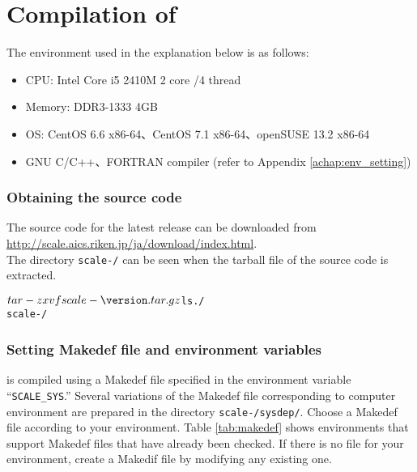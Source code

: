 \section{Compilation of \scalelib} \label{sec:scale_compile}

The environment used in the explanation below is as follows:
\begin{itemize}
\item CPU: Intel Core i5 2410M 2 core /4 thread
\item Memory: DDR3-1333 4GB
\item OS: CentOS 6.6 x86-64、CentOS 7.1 x86-64、openSUSE 13.2 x86-64
\item GNU C/C++、FORTRAN compiler (refer to Appendix \ref{achap:env_setting})
\end{itemize}

\subsubsection{Obtaining the source code} %
The source code for the latest release can be downloaded
from \url{http://scale.aics.riken.jp/ja/download/index.html}.\\
The directory \texttt{scale-{\version}/} can be seen when the tarball file of the source code is extracted. 
\begin{alltt}
 $ tar -zxvf scale-{\version}.tar.gz
 $ ls ./
    scale-{\version}/
\end{alltt}

\subsubsection{Setting Makedef file and environment variables} %

\scalelib is compiled using a Makedef file specified in the environment variable ``\verb|SCALE_SYS|.''  Several variations of the Makedef file corresponding to computer environment are prepared in the directory \texttt{scale-{\version}/sysdep/}.  Choose a Makedef file according to your environment. Table \ref{tab:makedef} shows  environments that support Makedef files that have already been checked. If there is no file for your environment,  create a Makedif file by modifying any existing one.

